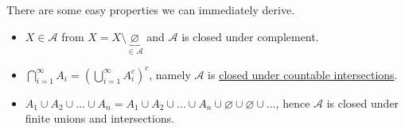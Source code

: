 \begin{remark}
	There are some easy properties we can immediately derive.
	\begin{itemize}
		\item \(X\in \mathcal{A} \) from \(X = X\setminus \underbrace{\varnothing}_{\in \mathcal{A}} \) and \(\mathcal{A}\) is closed under complement.
		\item \(\bigcap\limits_{i=1}^{\infty} A_{i} = \left(\bigcup\limits_{i=1}^{\infty} A_{i}^{c} \right)^c\), namely \(\mathcal{A} \) is \underline{closed under countable intersections}.
		\item \(A_1\cup A_2 \cup \ldots \cup A_n = A_1\cup A_2 \cup \ldots \cup A_n \cup \varnothing \cup \varnothing \cup\ldots\), hence \(\mathcal{A} \) is closed under finite unions and intersections.
	\end{itemize}
\end{remark}